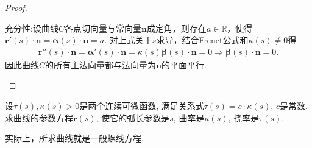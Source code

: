 \documentclass[../../main.tex]{subfiles}%
\begin{document}
\begin{proof}
\begin{enumerate}[(1)]
{\heiti 充分性:}设曲线$C$各点切向量与常向量$\bm{n}$成定角，则存在$a\in\mathbb{R}$，使得
$\bm{r}'(s)\cdot\bm{n}=\bm{\alpha}(s)\cdot\bm{n}=a.$
对上式关于$s$求导，结合\hyperref[theorem:微分几何-Frenet公式]{Frenet公式}和$\kappa(s)\ne0$得
\begin{align*}
\bm{r}''(s)\cdot\bm{n}=\bm{\alpha}'(s)\cdot\bm{n}=\kappa(s)\bm{\beta}(s)\cdot\bm{n}=0\Longrightarrow \bm{\beta}(s)\cdot\bm{n}=0.
\end{align*}
因此曲线$C$的所有主法向量都与法向量为$\bm{n}$的平面平行.
\end{enumerate}

\end{proof}

\begin{example}
设$\tau(s),\kappa(s) > 0$是两个连续可微函数, 满足关系式$\tau(s) = c \cdot \kappa(s)$, $c$是常数. 求曲线的参数方程$\bm{r}(s)$, 使它的弧长参数是$s$, 曲率是$\kappa(s)$, 挠率是$\tau(s)$.
\end{example}
\begin{remark}
实际上，所求曲线就是一般螺线方程.
\end{remark}
\end{document}
